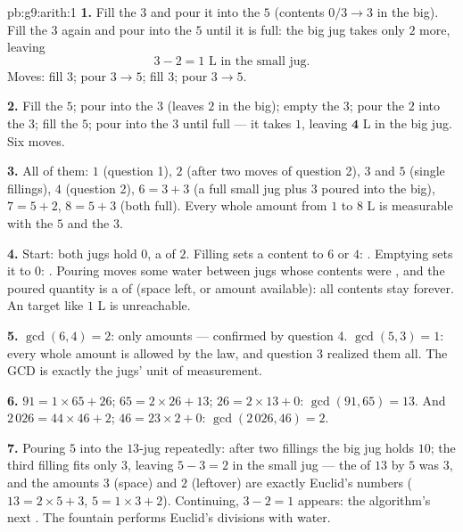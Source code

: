 \begin{solution}{pb:g9:arith:1}
\textbf{1.} Fill the $3$ and pour it into the $5$ (contents
$0/3 \to 3$ in the big). Fill the $3$ again and pour into the
$5$ until it is full: the big jug takes only $2$ more, leaving
\[
3 - 2 = 1 \text{ L in the small jug.}
\]
Moves: fill $3$; pour $3 \to 5$; fill $3$; pour $3 \to 5$.

\textbf{2.} Fill the $5$; pour into the $3$ (leaves $2$ in the
big); empty the $3$; pour the $2$ into the $3$; fill the $5$;
pour into the $3$ until full --- it takes $1$, leaving
$\mathbf{4}$ L in the big jug. Six moves.

\textbf{3.} All of them: $1$ (question 1), $2$ (after two moves
of question 2), $3$ and $5$ (single fillings), $4$ (question
2), $6 = 3 + 3$ (a full small jug plus $3$ poured into the
big), $7 = 5 + 2$, $8 = 5 + 3$ (both full). Every whole amount
from $1$ to $8$ L is measurable with the $5$ and the $3$.

\textbf{4.} Start: both jugs hold $0$, a  of $2$.
Filling sets a content to $6$ or $4$: . Emptying sets it to
$0$: . Pouring moves some water between jugs whose contents
were , and the poured quantity is a  of  (space left, or amount available): all contents stay
 forever. An  target like $1$ L is unreachable.

\textbf{5.} $\gcd(6, 4) = 2$: only  amounts --- confirmed by
question 4. $\gcd(5, 3) = 1$: every whole amount is allowed by
the law, and question 3 realized them all. The GCD is exactly
the jugs' unit of measurement.

\textbf{6.} $91 = 1 \times 65 + 26$; $65 = 2 \times 26 + 13$;
$26 = 2 \times 13 + 0$: $\gcd(91, 65) = 13$. And
$2\,026 = 44 \times 46 + 2$; $46 = 23 \times 2 + 0$:
$\gcd(2\,026, 46) = 2$.

\textbf{7.} Pouring $5$ into the $13$-jug repeatedly: after two
fillings the big jug holds $10$; the third filling fits only
$3$, leaving $5 - 3 = 2$ in the small jug --- the  of
$13$ by $5$ was $3$, and the amounts $3$ (space) and $2$
(leftover) are exactly Euclid's numbers ($13 = 2 \times 5 + 3$,
$5 = 1 \times 3 + 2$). Continuing, $3 - 2 = 1$ appears: the
algorithm's next . The fountain performs Euclid's
divisions with water.


\end{solution}
